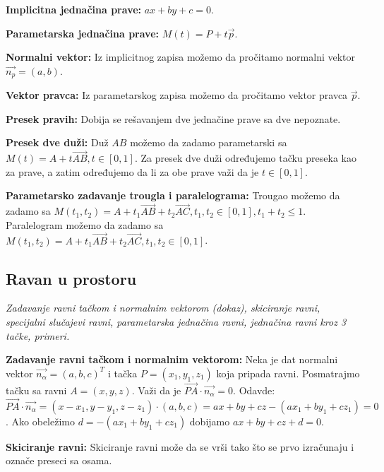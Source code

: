 \documentclass[12pt]{article}
\newcommand{\vek}[1]{\overrightarrow{#1}}
\begin{document}
\textbf{Implicitna jednačina prave:} $ax+by+c=0$.
\par

\textbf{Parametarska jednačina prave:} $M(t)=P+t\vek{p}$.
\par

\textbf{Normalni vektor:} Iz implicitnog zapisa možemo da pročitamo normalni
vektor $\vek{n_p}=(a,b)$.
\par

\textbf{Vektor pravca:} Iz parametarskog zapisa možemo da pročitamo vektor
pravca $\vek{p}$.
\par

\textbf{Presek pravih:} Dobija se rešavanjem dve jednačine prave sa dve
nepoznate.
\par

\textbf{Presek dve duži:} Duž $AB$ možemo da zadamo parametarski sa
$M(t)=A+t\vek{AB}, t\in[0,1]$. Za presek dve duži određujemo tačku preseka
kao za prave, a zatim određujemo da li za obe prave važi da je $t\in[0,1]$.
\par

\textbf{Parametarsko zadavanje trougla i paralelograma:} Trougao možemo da
zadamo sa $M(t_1,t_2)=A+t_1\vek{AB}+t_2\vek{AC}, t_1, t_2\in[0,1], t_1+t_2\leq1$.
Paralelogram možemo da zadamo sa $M(t_1,t_2)=A+t_1\vek{AB}+t_2\vek{AC}, t_1, t_2\in[0,1]$.

\subsection{Ravan u prostoru}
\textit{Zadavanje ravni tačkom i normalnim vektorom (dokaz), skiciranje ravni,
    specijalni slučajevi ravni, parametarska jednačina ravni, jednačina ravni kroz
    3 tačke, primeri.}
\par
\vspace*{1cm}

\textbf{Zadavanje ravni tačkom i normalnim vektorom:} Neka je dat normalni
vektor $\vek{n_\alpha}=(a,b,c)^T$ i tačka $P=(x_1,y_1,z_1)$ koja pripada ravni.
Posmatrajmo tačku sa ravni $A=(x,y,z)$. Važi da je
$\vek{PA}\cdot\vek{n_\alpha}=0$. Odavde:
$\vek{PA}\cdot\vek{n_\alpha}=(x-x_1,y-y_1,z-z_1)\cdot(a,b,c)=ax+by+cz-
    (ax_1+by_1+cz_1)=0$. Ako obeležimo $d=-(ax_1+by_1+cz_1)$ dobijamo
$ax+by+cz+d=0$.
\par

\textbf{Skiciranje ravni:} Skiciranje ravni može da se vrši tako što se prvo
izračunaju i označe preseci sa osama.
\par
\end{document}
